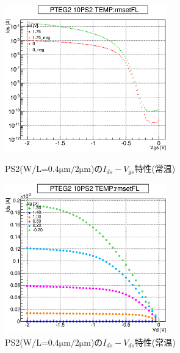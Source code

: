 				\begin{figure}[htbp]
					\begin{minipage}{0.5\hsize}
						\begin{center}
							\includegraphics[width=70mm]{./Chapter/Appendix/Picture/PST/PS2/PTEG2_10_PS2_IdVg_rmsetFL.eps}
						\end{center}
						\caption{PS2(W/L=$0.4\mathrm{\mu m}/2\mathrm{\mu m}$)の$I_{ds}-V_{gs}$特性(常温)}
						\label{fig:PS2_IdVg_room}
					\end{minipage}
					\begin{minipage}{0.5\hsize}
						\begin{center}
							\includegraphics[width=70mm]{./Chapter/Appendix/Picture/PST/PS2/PTEG2_10_PS2_IdVd_rmsetFL.eps}
						\end{center}
						\caption{PS2(W/L=$0.4\mathrm{\mu m}/2\mathrm{\mu m}$)の$I_{ds}-V_{ds}$特性(常温)}
						\label{fig:PS2_IdVd_room}
					\end{minipage}
				\end{figure}
